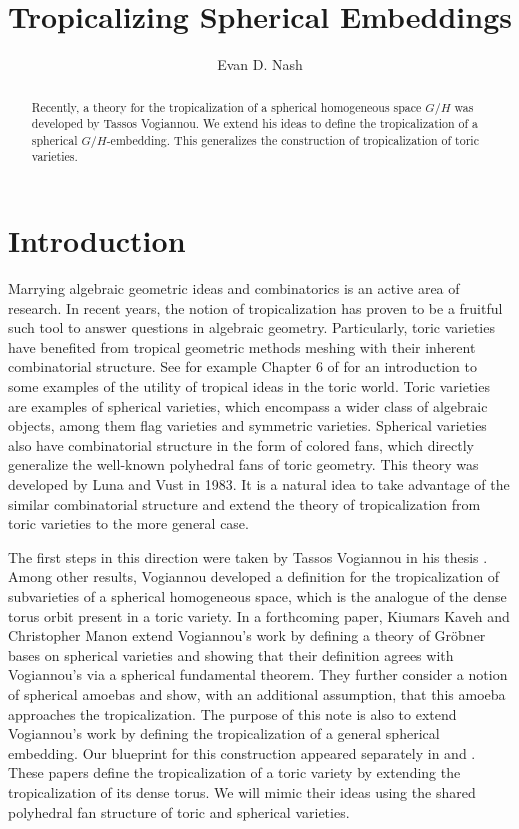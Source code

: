 \documentclass[12pt,twoside,cd]{amsart}
\title{Tropicalizing Spherical Embeddings}
\author{Evan D. Nash}
\theoremstyle{definition}
\begin{document}
\begin{abstract}
Recently, a theory for the tropicalization of a spherical homogeneous space $G/H$ was developed by Tassos Vogiannou. We extend his ideas to define the tropicalization of a spherical $G/H$-embedding. This generalizes the construction of tropicalization of toric varieties.
\end{abstract}
\maketitle
\small
\section*{Introduction}\label{intro}

Marrying algebraic geometric ideas and combinatorics is an active area of research. In recent years, the notion of tropicalization has proven to be a fruitful such tool to answer questions in algebraic geometry. Particularly, toric varieties have benefited from tropical geometric methods meshing with their inherent combinatorial structure. See for example Chapter 6 of \cite{MS} for an introduction to some examples of the utility of tropical ideas in the toric world. Toric varieties are examples of spherical varieties, which encompass a wider class of algebraic objects, among them flag varieties and symmetric varieties.
Spherical varieties also have combinatorial structure in the form of colored fans, which directly generalize the well-known polyhedral fans of toric geometry.
This theory was developed by Luna and Vust \cite{LV} in 1983.
It is a natural idea to take advantage of the similar combinatorial structure and extend the theory of tropicalization from toric varieties to the more general case.

The first steps in this direction were taken by Tassos Vogiannou in his thesis \cite{Vo}.
Among other results, Vogiannou developed a definition for the tropicalization of subvarieties of a spherical homogeneous space, which is the analogue of the dense torus orbit present in a toric variety.
In a forthcoming paper, Kiumars Kaveh and Christopher Manon extend Vogiannou's work by defining a theory of Gr\"obner bases on spherical varieties and showing that their definition agrees with Vogiannou's via a spherical fundamental theorem. 
They further consider a notion of spherical amoebas and show, with an additional assumption, that this amoeba approaches the tropicalization.
The purpose of this note is also to extend Vogiannou's work by defining the tropicalization of a general spherical embedding.
Our blueprint for this construction appeared separately in \cite{Ka} and \cite{Pay}.
These papers define the tropicalization of a toric variety by extending the tropicalization of its dense torus.
We will mimic their ideas using the shared polyhedral fan structure of toric and spherical varieties.
\end{document}
